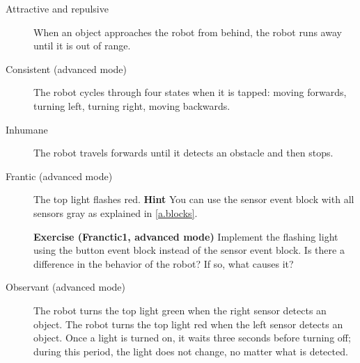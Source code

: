 \begin{description}
\item[Attractive and repulsive] When an object approaches the robot from
behind, the robot runs away until it is out of range.

\item[Consistent (advanced mode)] The robot cycles through four states when
it is tapped: moving forwards, turning left, turning right, moving
backwards.

\item[Inhumane] The robot travels forwards until it detects an obstacle
and then stops.

\item[Frantic (advanced mode)] The top light flashes red. \textbf{Hint}
You can use the sensor event block with all sensors gray as explained in
\cref{a.blocks}.

\textbf{Exercise (Franctic1, advanced mode)} Implement the flashing light using
the button event block instead of the sensor event block. Is there a
difference in the behavior of the robot? If so, what causes it?

\item[Observant (advanced mode)] The robot turns the top light green when the
right sensor detects an object. The robot turns the top light red when the
left sensor detects an object. Once a light is turned on, it waits three
seconds before turning off; during this period, the light does not change,
no matter what is detected.

\end{description}
